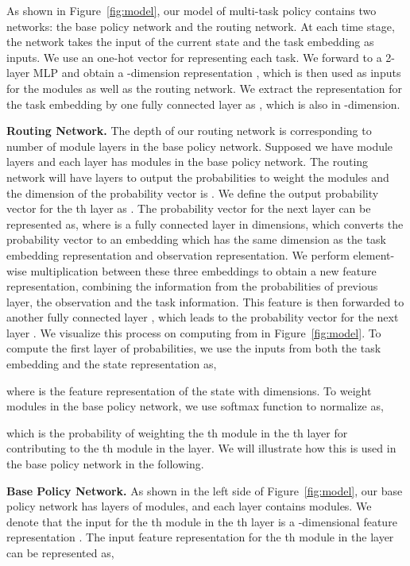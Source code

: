 \documentclass{article}
\begin{document}
As shown in Figure~\ref{fig:model}, our model of multi-task policy contains two networks: the base policy network and the routing network. At each time stage, the network takes the input of the current state  and the task embedding  as inputs. We use an one-hot vector for  representing each task. We forward  to a 2-layer MLP and obtain a -dimension representation , which is then used as inputs for the modules as well as the routing network. We extract the representation for the task embedding by one fully connected layer as , which is also in -dimension. 

\textbf{Routing Network.} The depth of our routing network is corresponding to number of module layers in the base policy network. Supposed we have  module layers and each layer has  modules in the base policy network. The routing network will have  layers to output the probabilities to weight the modules and the dimension of the probability vector is . We define the output probability vector for the th layer as . The probability vector for the next layer can be represented as,
{{
}}
where  is a fully connected layer in  dimensions, which converts the probability vector to an embedding which has the same dimension as the task embedding representation and observation representation. We perform element-wise multiplication between these three embeddings to obtain a new feature representation, combining the information from the probabilities of previous layer, the observation and the task information. This feature is then forwarded to another fully connected layer , which leads to the probability vector for the next layer . We visualize this process on computing  from  in Figure~\ref{fig:model}. To compute the first layer of probabilities, we use the inputs from both the task embedding and the state representation as,

where  is the feature representation of the state with  dimensions. To weight modules in the base policy network, we use softmax function to normalize  as,
\vspace{-0.05in}

which is the probability of weighting the th module in the th layer for contributing to the th module in the  layer. We will illustrate how this is used in the base policy network in the following.

\textbf{Base Policy Network.} As shown in the left side of Figure~\ref{fig:model}, our base policy network has  layers of modules, and each layer contains  modules. We denote that the input for the th module in the th layer is a -dimensional feature representation . The input feature representation for the th module in the  layer can be represented as,
\vspace{-0.1in}
\end{document}
